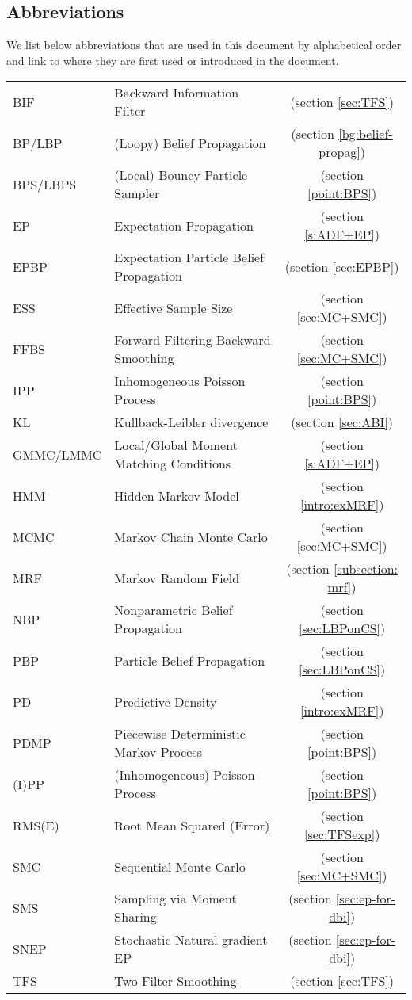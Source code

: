 \subsection*{Abbreviations}
We list below abbreviations that are used in this document by alphabetical order and link to where they are first used or introduced in the document.
\setlength{\tabcolsep}{12pt}
\renewcommand{\arraystretch}{1.2}
\begin{longtable}{llc}
BIF 			& Backward Information Filter &(section \ref{sec:TFS})\\
BP/LBP 		& (Loopy) Belief Propagation &(section \ref{bg:belief-propag})\\
BPS/LBPS 	& (Local) Bouncy Particle Sampler & (section \ref{point:BPS})\\
EP	 		& Expectation Propagation &(section \ref{s:ADF+EP})\\
EPBP 		& Expectation Particle Belief Propagation &(section \ref{sec:EPBP})\\
ESS 			& Effective Sample Size &(section \ref{sec:MC+SMC})\\
FFBS 		& Forward Filtering Backward Smoothing &(section \ref{sec:MC+SMC})\\
IPP 			& Inhomogeneous Poisson Process &(section \ref{point:BPS})\\
KL 			& Kullback-Leibler divergence & (section \ref{sec:ABI})\\
GMMC/LMMC	& Local/Global Moment Matching Conditions &(section \ref{s:ADF+EP})\\
HMM 		& Hidden Markov Model &(section \ref{intro:exMRF})\\
MCMC 		& Markov Chain Monte Carlo &(section \ref{sec:MC+SMC})\\
MRF 		& Markov Random Field &(section \ref{subsection: mrf})\\
NBP 			& Nonparametric Belief Propagation &(section \ref{sec:LBPonCS})\\
PBP	 		& Particle Belief Propagation &(section \ref{sec:LBPonCS})\\
PD 			& Predictive Density &(section \ref{intro:exMRF})\\
PDMP 		& Piecewise Deterministic Markov Process & (section \ref{point:BPS})\\
(I)PP		& (Inhomogeneous) Poisson Process & (section \ref{point:BPS})\\
RMS(E) 		& Root Mean Squared (Error) &(section \ref{sec:TFSexp})\\
SMC 		& Sequential Monte Carlo &(section \ref{sec:MC+SMC})\\
SMS 		& Sampling via Moment Sharing &(section \ref{sec:ep-for-dbi})\\
SNEP		& Stochastic Natural gradient EP &(section \ref{sec:ep-for-dbi})\\
TFS 			& Two Filter Smoothing &(section \ref{sec:TFS})\\ 
\end{longtable}
\setlength{\tabcolsep}{6pt} %

